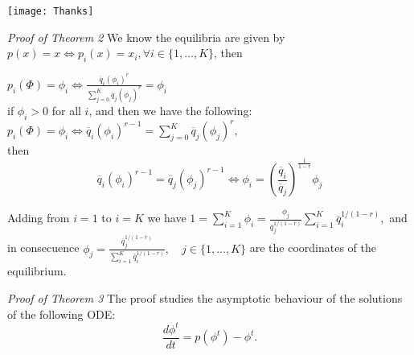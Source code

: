 {	
\begin{frame}[c]
\begin{center}

	\vspace{10em}
	 \texttt{[image: Thanks]}\\
	\vspace{.5em}
	
\end{center}
\end{frame}
}



\addtocounter{framenumber}{-1}
{
\begin{frame}[c]
{\it Proof of Theorem 2}
We know the equilibria are given by $p(x)=x\Leftrightarrow p_i(x)=x_i, \forall i\in\{1,...,K\} $, then
	
	$p_i(\Phi)=\phi_i\Leftrightarrow \frac{\overline{q}_i(\phi_i)^r}{\sum_{j=0}^K\overline{q}_j(\phi_j)^r}=\phi_i$\\
	if  $\phi_i>0$ for all $i$, and then we have the following:
	$p_i(\Phi)=\phi_i\Leftrightarrow \overline{q}_i(\phi_i)^{r-1}=\sum_{j=0}^K\overline{q}_j(\phi_j)^r,$\\
	then 	\begin{equation*}
	\overline{q}_i(\phi_i)^{r-1}=\overline{q}_j(\phi_j)^{r-1}\Leftrightarrow \phi_i=\left(\frac{\overline{q}_i}{\overline{q}_j}\right)^{\frac{1}{1-r}}\phi_j
	\end{equation*}
	
	Adding from $i=1$ to $i=K$ we have
	$1=\sum_{i=1}^K\phi_i=\frac{\phi_j}{\overline{q}_j^{1/(1-r)}}\sum_{i=1}^K\overline{q}_i^{1/(1-r)},$
	and in consecuence
	$\phi_j=\frac{\overline{q}_j^{1/(1-r)}}{\sum_{i=1}^K\overline{q}_i^{1/(1-r)}},\quad j\in \{1,...,K\} $ are the coordinates of the equilibrium.

\end{frame}




\addtocounter{framenumber}{-1}
{
\begin{frame}[c]
{\it Proof of Theorem 3}
The proof studies the asymptotic behaviour of the solutions of the following ODE:
\begin{equation}
\label{ODEE}
\frac{d \phi^t}{dt}=p(\phi^t)-\phi^t.
\end{equation}


\end{frame}}}
